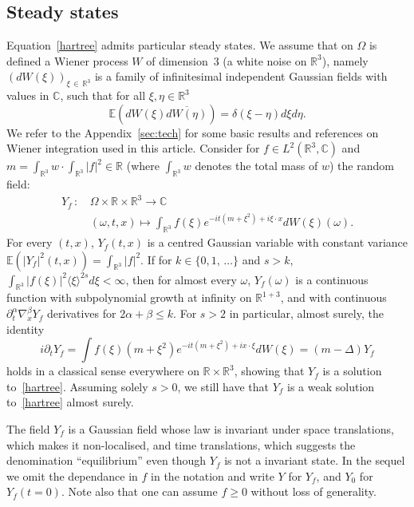 \documentclass[AHL, Unicode, longabstracts,published]{cedram}
\newcommand{\R}{\mathbb{R}}
\newcommand{\C}{\mathbb{C}}
\newcommand{\E}{\mathbb{E}}
\newcommand{\pa}{\partial}
\begin{document}
\subsection{Steady states} 
Equation~\eqref{hartree} admits particular steady states. We assume that on $\Omega$ is defined a Wiener process $W$ of dimension~$3$ (a white noise on $\R^3$), namely $(dW(\xi))_{\xi\,\in\,\R^3}$ is a family of infinitesimal independent Gaussian fields with values in $\C$, such that for all $\xi,\eta \in \R^3$
\[
\E\left(dW(\xi) \overline{dW(\eta)}\right) = \delta (\xi - \eta) d\xi d\eta.
\]
We refer to the Appendix~\ref{sec:tech} for some basic results and references on Wiener integration used in this article. Consider for $f\in L^2(\R^3, \C)$ and $m = \int_{\R^3} w \cdot \int_{\R^3}|f|^2\in \R$ (where $\int_{\R^3} w$ denotes the total mass of $w$) the random field:
\begin{equation}\label{id:Y}
\begin{split}
Y_f\,:\,&\Omega \times \R \times \R^3 \rightarrow \C \\
&(\omega, t, x) \mapsto \int_{\R^3} f(\xi) e^{-it\left(m+\xi^2\right)+i\xi \cdot x} dW(\xi)(\omega).
\end{split}
\end{equation}
For every $(t,x)$, $Y_f(t,x)$ is a centred Gaussian variable with constant variance $\E(|Y_f|^2(t,x))=\int_{\R^3} |f|^2$. If for $k\in \{0,1,\,\dots\}$ and $s>k$, $\int_{\R^3} |f(\xi)|^2\langle \xi\rangle^{2s}d\xi<\infty$, then for almost every $\omega$, $Y_f(\omega)$ is a continuous function with subpolynomial growth at infinity on $\R^{1+3}$, and with continuous $\pa_t^{\alpha}\nabla_x^\beta Y_f$ derivatives for $2\alpha+\beta\leq k$. For $s>2$ in particular, almost surely, the identity
\[
i\partial_t Y_f = \int f(\xi) \left(m+ \xi^2\right) e^{-it\left(m+\xi^2\right) + ix\cdot \xi}dW(\xi) = (m-\Delta) Y_f
\]
holds in a classical sense everywhere on $\R\times \R^3$, showing that $Y_f$ is a solution to~\eqref{hartree}. Assuming solely $s>0$, we still have that $Y_f$ is a weak solution to~\eqref{hartree} almost surely.

The field $Y_f$ is a Gaussian field whose law is invariant under space translations, which makes it non-localised, and time translations, which suggests the denomination ``equilibrium'' even though $Y_f$ is not a invariant state. In the sequel we omit the dependance in $f$ in the notation and write $Y$ for $Y_f$, and $Y_0$ for $Y_f(t=0)$. Note also that one can assume $f\geq 0$ without loss of generality.
\end{document}
